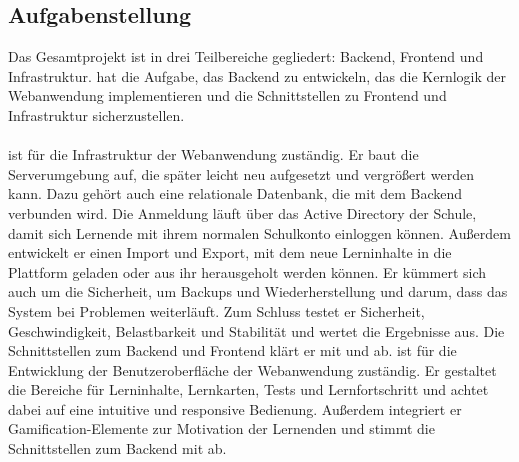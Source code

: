 

\subsection{Aufgabenstellung}
Das Gesamtprojekt ist in drei Teilbereiche gegliedert: Backend, Frontend und Infrastruktur.
\Luca  hat die Aufgabe, das Backend zu entwickeln, das die Kernlogik der Webanwendung implementieren und die Schnittstellen zu Frontend und Infrastruktur sicherzustellen. \\ \\
\Jai ist für die Infrastruktur der Webanwendung zuständig. Er baut die Serverumgebung auf, die später leicht neu aufgesetzt und vergrößert werden kann. Dazu gehört auch eine relationale Datenbank, die mit dem Backend verbunden wird. Die Anmeldung läuft über das Active Directory der Schule, damit sich Lernende mit ihrem normalen Schulkonto einloggen können. Außerdem entwickelt er einen Import und Export, mit dem neue Lerninhalte in die Plattform geladen oder aus ihr herausgeholt werden können. Er kümmert sich auch um die Sicherheit, um Backups und Wiederherstellung und darum, dass das System bei Problemen weiterläuft. Zum Schluss testet er Sicherheit, Geschwindigkeit, Belastbarkeit und Stabilität und wertet die Ergebnisse aus. Die Schnittstellen zum Backend und Frontend klärt er mit \Luca und \Jakob ab.
\Jakob ist für die Entwicklung der Benutzeroberfläche der Webanwendung zuständig. Er gestaltet die Bereiche für Lerninhalte, Lernkarten, Tests und Lernfortschritt und achtet dabei auf eine intuitive und responsive Bedienung. Außerdem integriert er Gamification-Elemente zur Motivation der Lernenden und stimmt die Schnittstellen zum Backend mit \Luca ab.